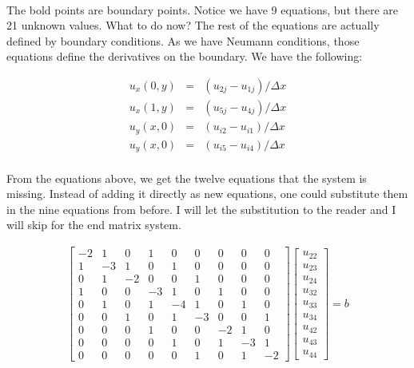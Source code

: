 \documentclass[11pt]{article}
\begin{document}
\paragraph{} The bold points are boundary points. Notice we have 9 equations, but there are 21 unknown values. What to do now? The rest of the equations are actually defined by boundary conditions. As we have Neumann conditions, those equations define the derivatives on the boundary. We have the following:

\begin{eqnarray}
u_x\left(0, y\right) & = & (u_{2j} - u_{1j})/\Delta x\\
u_x\left(1, y\right) & = & (u_{5j} - u_{4j})/\Delta x\\
u_y\left(x, 0\right) & = & (u_{i2} - u_{i1})/\Delta x\\
u_y\left(x, 0\right) & = & (u_{i5} - u_{i4})/\Delta x
\end{eqnarray}

\paragraph{} From the equations above, we get the twelve equations that the system is missing. Instead of adding it directly as new equations, one could substitute them in the nine equations from before. I will let the substitution to the reader and I will skip for the end matrix system.

\begin{eqnarray}
\left[\begin{array}{ccccccccc}
-2 & 1 & 0 & 1 & 0 & 0 & 0 & 0 & 0\\
1 & -3 & 1 & 0 & 1 & 0 & 0 & 0 & 0\\
0 & 1 & -2 & 0 & 0 & 1 & 0 & 0 & 0\\
1 & 0 & 0 & -3 & 1 & 0 & 1 & 0 & 0\\
0 & 1 & 0 & 1 & -4 & 1 & 0 & 1 & 0\\
0 & 0 & 1 & 0 & 1 & -3 & 0 & 0 & 1\\
0 & 0 & 0 & 1 & 0 & 0 & -2 & 1 & 0\\
0 & 0 & 0 & 0 & 1 & 0 & 1 & -3 & 1\\
0 & 0 & 0 & 0 & 0 & 1 & 0 & 1 & -2 
\end{array}\right] \left[\begin{array}{c}
u_{22}\\ u_{23}\\ u_{24}	\\ u_{32}\\ u_{33}\\ u_{34}\\ u_{42}\\u_{43} \\u_{44}
\end{array}\right] = b
\end{eqnarray}
\end{document}
